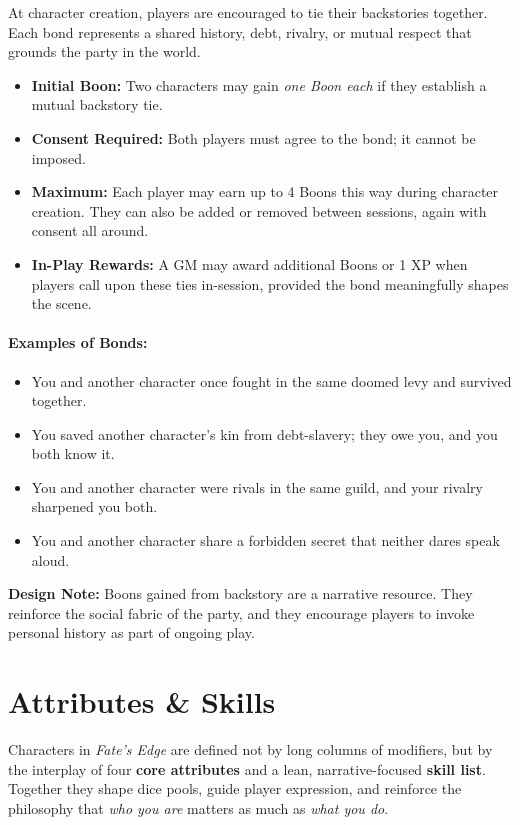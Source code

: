 \documentclass[12pt]{book}
\begin{document}
At character creation, players are encouraged to tie their backstories together.  
Each bond represents a shared history, debt, rivalry, or mutual respect that grounds the party in the world.  

\begin{itemize}
  \item \textbf{Initial Boon:} Two characters may gain \emph{one Boon each} if they establish a mutual backstory tie.  
  \item \textbf{Consent Required:} Both players must agree to the bond; it cannot be imposed.  
  \item \textbf{Maximum:} Each player may earn up to 4 Boons this way during character creation. They can also be added or removed between sessions, again with consent all around. 
  \item \textbf{In-Play Rewards:} A GM may award additional Boons or 1 XP when players call upon these ties in-session, provided the bond meaningfully shapes the scene.  
\end{itemize}

\paragraph{Examples of Bonds:}
\begin{itemize}
  \item You and another character once fought in the same doomed levy and survived together.  
  \item You saved another character’s kin from debt-slavery; they owe you, and you both know it.  
  \item You and another character were rivals in the same guild, and your rivalry sharpened you both.  
  \item You and another character share a forbidden secret that neither dares speak aloud.  
\end{itemize}

\noindent
\textbf{Design Note:} Boons gained from backstory are a narrative resource.  
They reinforce the social fabric of the party, and they encourage players to invoke personal history as part of ongoing play.

\section{Attributes \& Skills}

Characters in \textit{Fate’s Edge} are defined not by long columns of modifiers, but by the interplay of four \textbf{core attributes} and a lean, narrative-focused \textbf{skill list}. Together they shape dice pools, guide player expression, and reinforce the philosophy that \emph{who you are} matters as much as \emph{what you do}.
\end{document}

